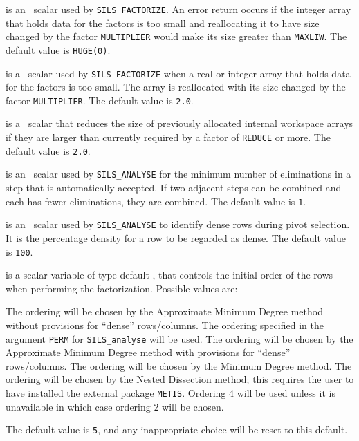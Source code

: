 \documentclass{galahad}
\newcommand{\packagename}{SILS}
\begin{document}
\begin{description}
 is an \integer\ scalar used by {\tt \packagename\_FACTORIZE}.
An error
return occurs if the integer array that holds data for the factors is too
small and reallocating it to have size changed by the factor {\tt MULTIPLIER}
would make its size greater than {\tt MAXLIW}. The default value is
{\tt HUGE(0)}.

 is a \realdp\ scalar used by {\tt \packagename\_FACTORIZE}
when a real or integer array that holds data for the factors is too small. The
array is reallocated with its size changed by the factor {\tt MULTIPLIER}.
The default value is {\tt 2.0}.

 is a \realdp\ scalar that reduces the size of previously
allocated
internal workspace arrays if they are larger than currently required
by a factor of {\tt REDUCE} or more. The default value is {\tt 2.0}.

 is an \integer\ scalar used by {\tt \packagename\_ANALYSE} for the
  minimum number of eliminations in a step that is automatically
  accepted. If two adjacent steps can be combined and each has fewer
  eliminations, they are combined.  The default value is {\tt 1}.

 is an \integer\ scalar used by {\tt \packagename\_ANALYSE} to
identify dense
rows during pivot selection.  It is the percentage density for a row to
be regarded as dense.  The default value is {\tt 100}.

 is a scalar variable of type default \integer, that
controls the initial order of the rows when performing the factorization.
Possible values are:
\begin{description}
 The ordering will be chosen by the Approximate Minimum Degree method
       without provisions for ``dense'' rows/columns.
 The ordering specified in the argument {\tt PERM} for
       {\tt \packagename\_analyse} will be used.
 The ordering will be chosen by the Approximate Minimum Degree method
       with provisions for ``dense'' rows/columns.
 The ordering will be chosen by the Minimum Degree method.
 The ordering will be chosen by the Nested Dissection method; this
 requires the user to have installed the external package {\tt METIS}.
 Ordering 4 will be used unless it is unavailable in which case
ordering 2 will be chosen.
\end{description}
The default value is {\tt 5}, and any inappropriate choice
will be reset to this default.


\end{description}
\end{document}
